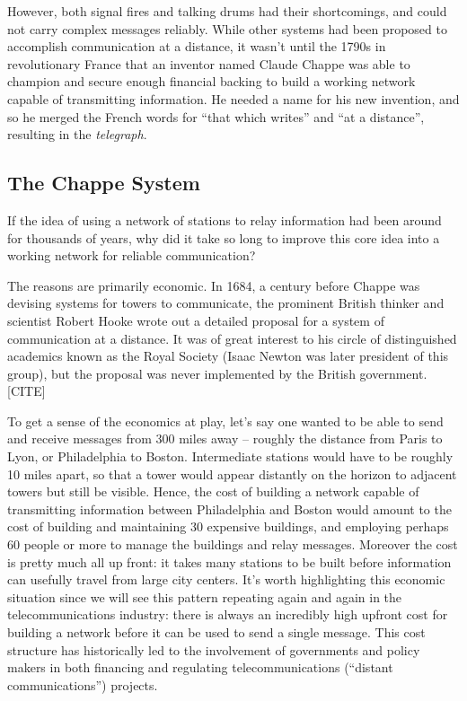 \documentclass[UTF8]{book}
\begin{document}
\begin{CJK}{UTF8}{gbsn}
However, both signal fires and talking drums had their shortcomings, and could not carry complex messages reliably. While other systems had been proposed to accomplish communication at a distance, it wasn't until the 1790s in revolutionary France that an inventor named Claude Chappe was able to champion and secure enough financial backing to build a working network capable of transmitting information. He needed a name for his new invention, and so he merged the French words for ``that which writes'' and ``at a distance'', resulting in the \emph{telegraph}.

\subsection{The Chappe System}

If the idea of using a network of stations to relay information had been around for thousands of years, why did it take so long to improve this core idea into a working network for reliable communication?

The reasons are primarily economic. In 1684, a century before Chappe was devising systems for towers to communicate, the prominent British thinker and scientist Robert Hooke wrote out a detailed proposal for a system of communication at a distance. It was of great interest to his circle of distinguished academics known as the Royal Society (Isaac Newton was later president of this group), but the proposal was never implemented by the British government. [CITE]

To get a sense of the economics at play, let's say one wanted to be able to send and receive messages from 300 miles away -- roughly the distance from Paris to Lyon, or Philadelphia to Boston. Intermediate stations would have to be roughly 10 miles apart, so that a tower would appear distantly on the horizon to adjacent towers but still be visible. Hence, the cost of building a network capable of transmitting information between Philadelphia and Boston would amount to the cost of building and maintaining 30 expensive buildings, and employing perhaps 60 people or more to manage the buildings and relay messages. Moreover the cost is pretty much all up front: it takes many stations to be built before information can usefully travel from large city centers. It's worth highlighting this economic situation since we will see this pattern repeating again and again in the telecommunications industry: there is always an incredibly high upfront cost for building a network before it can be used to send a single message. This cost structure has historically led to the involvement of governments and policy makers in both financing and regulating telecommunications (``distant communications'') projects.


\end{CJK}
\end{document}
